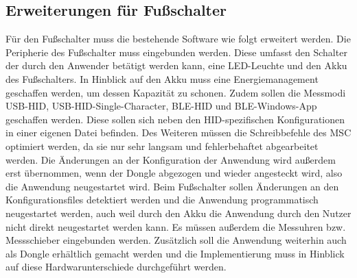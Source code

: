 \subsection{Erweiterungen für Fußschalter}
Für den Fußschalter muss die bestehende Software wie folgt erweitert werden. Die Peripherie des Fußschalter muss eingebunden werden. Diese umfasst den Schalter der durch den Anwender betätigt werden kann, eine LED-Leuchte und den Akku des Fußschalters. In Hinblick auf den Akku muss eine Energiemanagement geschaffen werden, um dessen Kapazität zu schonen. Zudem sollen die Messmodi \ac{USB}-\ac{HID}, \ac{USB}-\ac{HID}-Single-Character, \ac{BLE}-\ac{HID} und \ac{BLE}-Windows-App geschaffen werden. Diese sollen sich neben den \ac{HID}-spezifischen Konfigurationen in einer eigenen Datei befinden. Des Weiteren müssen die Schreibbefehle des \ac{MSC} optimiert werden, da sie nur sehr langsam und fehlerbehaftet abgearbeitet werden. Die Änderungen an der Konfiguration der Anwendung wird außerdem erst übernommen, wenn der Dongle abgezogen und wieder angesteckt wird, also die Anwendung neugestartet wird. Beim Fußschalter sollen Änderungen an den Konfigurationsfiles detektiert werden und die Anwendung programmatisch neugestartet werden, auch weil durch den Akku die Anwendung durch den Nutzer nicht direkt neugestartet werden kann. Es müssen außerdem die Messuhren bzw. Messschieber eingebunden werden. Zusätzlich soll die Anwendung weiterhin auch als Dongle erhältlich gemacht werden und die Implementierung muss in Hinblick auf diese Hardwarunterschiede durchgeführt werden.